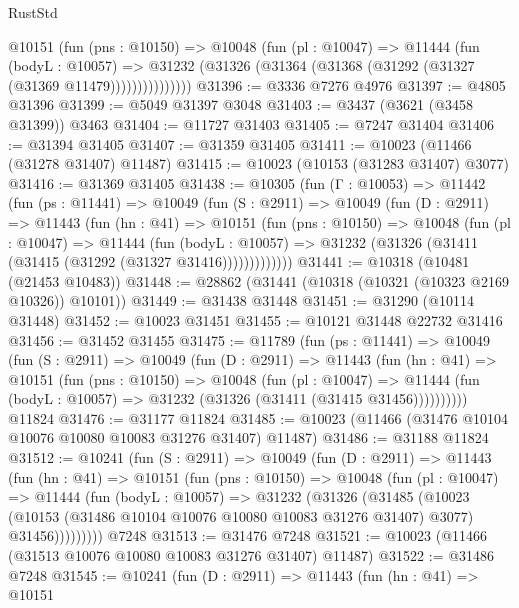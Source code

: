 \begin{lexlean}{RustStd}
\begin{coremodule}
              @10151
                (fun (pns : @10150) =>
                @10048
                  (fun (pl : @10047) =>
                  @11444
                    (fun (bodyL : @10057) =>
                    @31232 (@31326 (@31364 (@31368 (@31292 (@31327 (@31369 @11479)))))))))))))))
@31396 := @3336 @7276 @4976
@31397 := @4805 @31396
@31399 := @5049 @31397 @3048
@31403 := @3437 (@3621 (@3458 @31399)) @3463
@31404 := @11727 @31403
@31405 := @7247 @31404
@31406 := @31394 @31405
@31407 := @31359 @31405
@31411 := @10023 (@11466 (@31278 @31407) @11487)
@31415 := @10023 (@10153 (@31283 @31407) @3077)
@31416 := @31369 @31405
@31438 := @10305
    (fun (Γ : @10053) =>
    @11442
      (fun (ps : @11441) =>
      @10049
        (fun (S : @2911) =>
        @10049
          (fun (D : @2911) =>
          @11443
            (fun (hn : @41) =>
            @10151
              (fun (pns : @10150) =>
              @10048
                (fun (pl : @10047) =>
                @11444
                  (fun (bodyL : @10057) =>
                  @31232 (@31326 (@31411 (@31415 (@31292 (@31327 @31416)))))))))))))
@31441 := @10318 (@10481 (@21453 @10483))
@31448 := @28862 (@31441 (@10318 (@10321 (@10323 @2169 @10326)) @10101))
@31449 := @31438 @31448
@31451 := @31290 (@10114 @31448)
@31452 := @10023 @31451
@31455 := @10121 @31448 @22732 @31416
@31456 := @31452 @31455
@31475 := @11789
    (fun (ps : @11441) =>
    @10049
      (fun (S : @2911) =>
      @10049
        (fun (D : @2911) =>
        @11443
          (fun (hn : @41) =>
          @10151
            (fun (pns : @10150) =>
            @10048
              (fun (pl : @10047) =>
              @11444 (fun (bodyL : @10057) => @31232 (@31326 (@31411 (@31415 @31456))))))))))
    @11824
@31476 := @31177 @11824
@31485 := @10023 (@11466 (@31476 @10104 @10076 @10080 @10083 @31276 @31407) @11487)
@31486 := @31188 @11824
@31512 := @10241
    (fun (S : @2911) =>
    @10049
      (fun (D : @2911) =>
      @11443
        (fun (hn : @41) =>
        @10151
          (fun (pns : @10150) =>
          @10048
            (fun (pl : @10047) =>
            @11444
              (fun (bodyL : @10057) =>
              @31232
                (@31326
                  (@31485
                    (@10023
                      (@10153 (@31486 @10104 @10076 @10080 @10083 @31276 @31407) @3077)
                      @31456)))))))))
    @7248
@31513 := @31476 @7248
@31521 := @10023 (@11466 (@31513 @10076 @10080 @10083 @31276 @31407) @11487)
@31522 := @31486 @7248
@31545 := @10241
    (fun (D : @2911) =>
    @11443
      (fun (hn : @41) =>
      @10151

\end{coremodule}
\end{lexlean}
